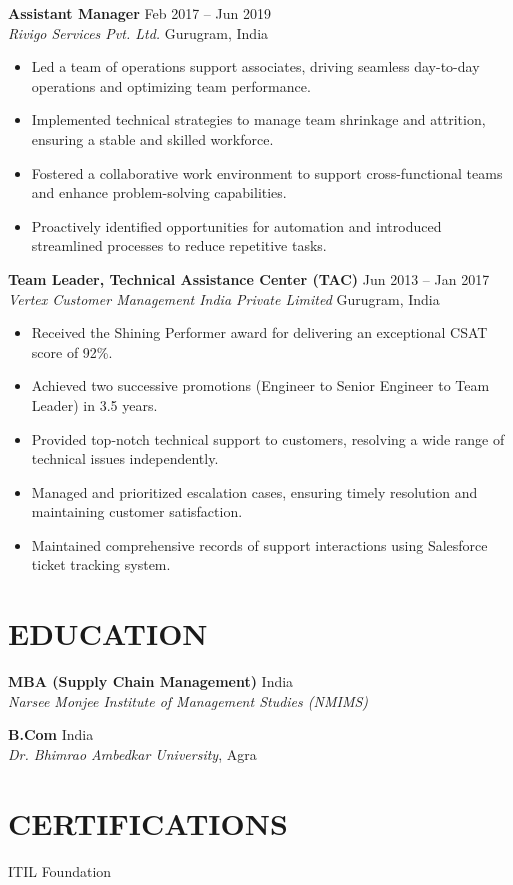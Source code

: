 \documentclass[11pt,a4paper]{article}
\begin{document}
\textbf{Assistant Manager} \hfill Feb 2017 -- Jun 2019\\
\textit{Rivigo Services Pvt. Ltd.} \hfill Gurugram, India
\begin{itemize}[leftmargin=*]
  \item Led a team of operations support associates, driving seamless day-to-day operations and optimizing team performance.
  \item Implemented technical strategies to manage team shrinkage and attrition, ensuring a stable and skilled workforce.
  \item Fostered a collaborative work environment to support cross-functional teams and enhance problem-solving capabilities.
  \item Proactively identified opportunities for automation and introduced streamlined processes to reduce repetitive tasks.
\end{itemize}

\textbf{Team Leader, Technical Assistance Center (TAC)} \hfill Jun 2013 -- Jan 2017\\
\textit{Vertex Customer Management India Private Limited} \hfill Gurugram, India
\begin{itemize}[leftmargin=*]
  \item Received the Shining Performer award for delivering an exceptional CSAT score of 92\%.
  \item Achieved two successive promotions (Engineer to Senior Engineer to Team Leader) in 3.5 years.
  \item Provided top-notch technical support to customers, resolving a wide range of technical issues independently.
  \item Managed and prioritized escalation cases, ensuring timely resolution and maintaining customer satisfaction.
  \item Maintained comprehensive records of support interactions using Salesforce ticket tracking system.
\end{itemize}

\section*{EDUCATION}
\textbf{MBA (Supply Chain Management)} \hfill India\\
\textit{Narsee Monjee Institute of Management Studies (NMIMS)} 

\textbf{B.Com} \hfill India\\
\textit{Dr. Bhimrao Ambedkar University}, Agra

\section*{CERTIFICATIONS}
ITIL Foundation
\end{document}
